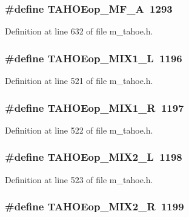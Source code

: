 \subsubsection{\setlength{\rightskip}{0pt plus 5cm}\#define TAHOEop\_\-MF\_\-A~1293}\label{m__tahoe_8h_84f28e46f86907c92f0cf8d3d67ed1c8}




Definition at line 632 of file m\_\-tahoe.h.
\subsubsection{\setlength{\rightskip}{0pt plus 5cm}\#define TAHOEop\_\-MIX1\_\-L~1196}\label{m__tahoe_8h_5fefb762739c08c24c779b0d2341ddb6}




Definition at line 521 of file m\_\-tahoe.h.
\subsubsection{\setlength{\rightskip}{0pt plus 5cm}\#define TAHOEop\_\-MIX1\_\-R~1197}\label{m__tahoe_8h_bbec57f9c1e7628a2315dcd0d732a836}




Definition at line 522 of file m\_\-tahoe.h.
\subsubsection{\setlength{\rightskip}{0pt plus 5cm}\#define TAHOEop\_\-MIX2\_\-L~1198}\label{m__tahoe_8h_406872f9c2637478b524f4c4b2174443}




Definition at line 523 of file m\_\-tahoe.h.
\subsubsection{\setlength{\rightskip}{0pt plus 5cm}\#define TAHOEop\_\-MIX2\_\-R~1199}\label{m__tahoe_8h_6a89dc6631a5bb1c99cb1928a0406c08}




